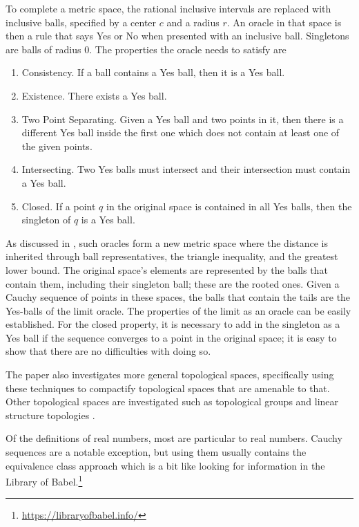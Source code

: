 \documentclass[12pt]{article}
\begin{document}
To complete a metric space, the rational inclusive intervals are replaced with inclusive balls, specified by a center $c$ and a radius $r$. An oracle in that space is then a rule that says Yes or No when presented with an inclusive ball. Singletons are balls of radius $0$. The properties the oracle needs to satisfy are
\begin{enumerate}
    \item Consistency. If a ball contains a Yes ball, then it is a Yes ball. 
    \item Existence. There exists a Yes ball.
    \item Two Point Separating. Given a Yes ball and two points in it, then there is a different Yes ball inside the first one which does not contain at least one of the given points. 
    \item Intersecting. Two Yes balls must intersect and their intersection must contain a Yes ball.
    \item Closed. If a point $q$ in the original space is contained in all Yes balls, then the singleton of $q$ is a Yes ball.
\end{enumerate}

As discussed in \cite{taylor23metric}, such oracles form a new metric space where the distance is inherited through ball representatives, the triangle inequality, and the greatest lower bound. The original space's elements are represented by the balls that contain them, including their singleton ball; these are the rooted ones. Given a Cauchy sequence of points in these spaces, the balls that contain the tails are the Yes-balls of the limit oracle. The properties of the limit as an oracle can be easily established. For the closed property, it is necessary to add in the singleton as a Yes ball if the sequence converges to a point in the original space; it is easy to show that there are no difficulties with doing so. 

The paper also investigates more general topological spaces, specifically using these techniques to compactify topological spaces that are amenable to that. Other topological spaces are investigated such as topological groups and linear structure topologies \cite{maudlin}. 

Of the definitions of real numbers, most are particular to real numbers. Cauchy sequences are a notable exception, but using them usually contains the equivalence class approach which is a bit like looking for information in the Library of Babel.\footnote{\url{https://libraryofbabel.info/}} 
\end{document}
